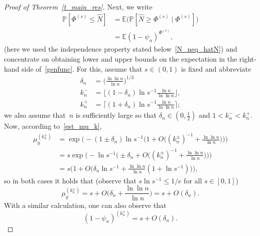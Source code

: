 \documentclass[AHL,Unicode,longabstracts]{cedram}
\newcommand{\1}[1]{{\mathbf 1}{\{#1\}}}
\newcommand{\hN}{{\widehat N}}
\newcommand{\8}{{\infty}}
\newcommand{\IP}{{\mathbb P}}
\newcommand{\IE}{{\mathbb E}}
\begin{document}
\begin{proof}[Proof of Theorem~\ref{t_main_res}]
Next, we write
\begin{align}
\IP[\Phi^{(s)}\leq \hN] &= \IE \big(\IP[\hN \geq \Phi^{(s)}\mid\Phi^{(s)}]\big)\nonumber \\
&=\IE (1-\psi_n)^{\Phi^{(s)}},\label{genfunc}
\end{align}
(here we used the independence property stated below~\eqref{N_neq_hatN}) and concentrate on obtaining lower and upper bounds on the expectation in the right-hand side of~\eqref{genfunc}. For this, assume that $s\in(0,1)$ is fixed and abbreviate
\begin{align*}
\delta_n &= \Big(\frac{\ln\ln n}{\ln n}\Big)^{1/3}\\
k_n^{-} &= \Big\lfloor(1-\delta_n)\ln s^{-1} \frac{\ln n}{\ln\ln n}
\Big\rfloor,\\
k_n^{+} &= \Big\lceil(1+\delta_n)\ln s^{-1} \frac{\ln n}{\ln\ln n}
\Big\rceil;
\end{align*}
we also assume that~$n$ is sufficiently large so that $\delta_n \in(0,\frac{1}{2})$ and $1<k_n^{-}<k_n^{+}$. Now, according to~\eqref{est_mu_k},
\begin{align*}
\mu_y^{(k_n^{\pm})} &= \exp\Big(-(1\pm \delta_n)\ln s^{-1}
\Big(1+O\Big((k_n^{\pm})^{-1}+\frac{\ln\ln n}{\ln n}\Big)\Big)\Big)\\
& = s \exp\Big(-\ln s^{-1}
\Big(\pm \delta_n+O\Big((k_n^{\pm})^{-1}+\frac{\ln\ln n}{\ln n}\Big)\Big)\Big)\\
& = s \Big(1+O\Big(\delta_n\ln s^{-1} + \frac{\ln\ln n}{\ln n}(1+\ln s^{-1})\Big)\Big),
\end{align*}
so in both cases it holds that (observe that $s\ln s^{-1}\leq 1/e$ for all $s\in[0,1]$)
\begin{equation}\label{muk_ourcase}
\mu_y^{(k_n^{\pm})} = s + O\Big(\delta_n +\frac{\ln\ln n}{\ln n} \Big) = s + O(\delta_n).
\end{equation}
With a similar calculation, one can also observe that
\begin{equation}\label{1-psi_ourcase}
(1-\psi_n)^{(k_n^{\pm})} = s + O(\delta_n).
\end{equation}


\end{proof}
\end{document}
